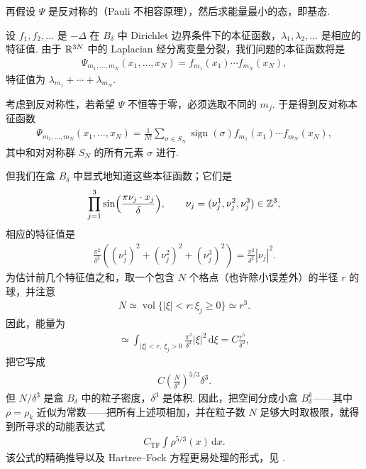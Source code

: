 再假设 $\Psi$ 是反对称的（Pauli 不相容原理），然后求能量最小的态，即基态.

设 $f_1, f_2, \ldots$ 是 $-\Delta$ 在 $B_\delta$ 中 Dirichlet 边界条件下的本征函数，$\lambda_1, \lambda_2, \ldots$ 是相应的特征值. 由于 $\mathbb{R}^{3N}$ 中的 Laplacian 经分离变量分裂，我们问题的本征函数将是
\begin{align*}
  \Psi_{m_{1},\ldots,m_{N}}(x_{1},\ldots,x_{N})=f_{m_{1}}(x_{1})\cdots f_{m_{N}}(x_{N}),
\end{align*}
特征值为 $\lambda_{m_1} + \cdots + \lambda_{m_N}$.

考虑到反对称性，若希望 $\Psi$ 不恒等于零，必须选取不同的 $m_j$. 于是得到反对称本征函数
\begin{align*}
  \Psi_{m_{1},\ldots,m_{N}}(x_{1},\ldots,x_{N})
  =\frac{1}{N!}\sum_{\sigma\in S_{N}}\operatorname{sign}(\sigma)f_{m_{1}}(x_{1})\cdots f_{m_{N}}(x_{N}),
\end{align*}
其中和对对称群 $S_{N}$ 的所有元素 $\sigma$ 进行.

但我们在盒 $B_{\delta}$ 中显式地知道这些本征函数；它们是
\begin{align*}
  \prod_{j=1}^{3}\sin\Bigl(\frac{\pi\nu_{j}\cdot x_{j}}{\delta}\Bigr),\qquad
  \nu_{j}=(\nu_{j}^{1},\nu_{j}^{2},\nu_{j}^{3})\in\mathbb{Z}^{3},
\end{align*}
相应的特征值是
\begin{align*}
  \frac{\pi^{2}}{\delta^{2}}\left((\nu_{j}^{1})^{2}+(\nu_{j}^{2})^{2}+(\nu_{j}^{3})^{2}\right)
  =\frac{\pi^{2}}{\delta^{2}}|\nu_{j}|^{2}.
\end{align*}
为估计前几个特征值之和，取一个包含 $N$ 个格点（也许除小误差外）的半径 $r$ 的球，并注意
\begin{align*}
  N\simeq\operatorname{vol}\{|\xi|<r:\xi_{j}\geq 0\}\simeq r^{3}.
\end{align*}
因此，能量为
\begin{align*}
  \simeq\int_{|\xi|<r,\ \xi_{j}>0}\frac{\pi^{2}}{\delta^{2}}|\xi|^{2}\,\mathrm{d}\xi=C\frac{r^{5}}{\delta^{2}},
\end{align*}
把它写成
\begin{align*}
  C\left(\frac{N}{\delta^{3}}\right)^{5/3}\delta^{3}.
\end{align*}
但 $N/\delta^{3}$ 是盒 $B_{\delta}$ 中的粒子密度，$\delta^{3}$ 是体积. 因此，把空间分成小盒 $B_{\delta}^{k}$——其中 $\rho = \rho_{k}$ 近似为常数——把所有上述项相加，并在粒子数 $N$ 足够大时取极限，就得到所寻求的动能表达式
\begin{align*}
  C_{\mathrm{TF}}\int\rho^{5/3}(x)\,\mathrm{d}x.
\end{align*}
该公式的精确推导以及 Hartree--Fock 方程更易处理的形式，见 \cite{b221,b220}.

